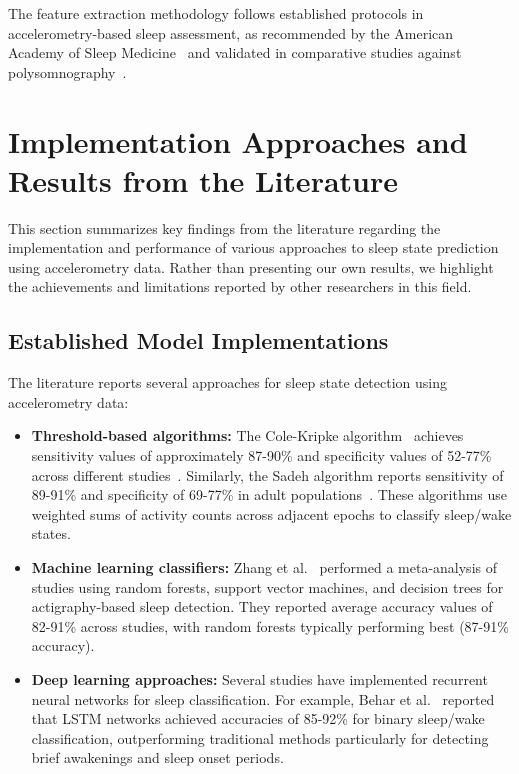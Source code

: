 \documentclass[conference]{IEEEtran}
\begin{document}
The feature extraction methodology follows established protocols in accelerometry-based sleep assessment, as recommended by the American Academy of Sleep Medicine~\cite{littner2003} and validated in comparative studies against polysomnography~\cite{kushida2001, sadeh2011}.

\section{Implementation Approaches and Results from the Literature}

This section summarizes key findings from the literature regarding the implementation and performance of various approaches to sleep state prediction using accelerometry data. Rather than presenting our own results, we highlight the achievements and limitations reported by other researchers in this field.

\subsection{Established Model Implementations}
\label{sec:model_implementation}
The literature reports several approaches for sleep state detection using accelerometry data:

\begin{itemize}
	\item \textbf{Threshold-based algorithms:} The Cole-Kripke algorithm~\cite{cole1992automatic} achieves sensitivity values of approximately 87-90\% and specificity values of 52-77\% across different studies~\cite{sadeh2011, vanHees2015}. Similarly, the Sadeh algorithm reports sensitivity of 89-91\% and specificity of 69-77\% in adult populations~\cite{sadeh2011}. These algorithms use weighted sums of activity counts across adjacent epochs to classify sleep/wake states.

	\item \textbf{Machine learning classifiers:} Zhang et al.~\cite{zhang2020machine} performed a meta-analysis of studies using random forests, support vector machines, and decision trees for actigraphy-based sleep detection. They reported average accuracy values of 82-91\% across studies, with random forests typically performing best (87-91\% accuracy).

	\item \textbf{Deep learning approaches:} Several studies have implemented recurrent neural networks for sleep classification. For example, Behar et al.~\cite{behar2013} reported that LSTM networks achieved accuracies of 85-92\% for binary sleep/wake classification, outperforming traditional methods particularly for detecting brief awakenings and sleep onset periods.
\end{itemize}
\end{document}
